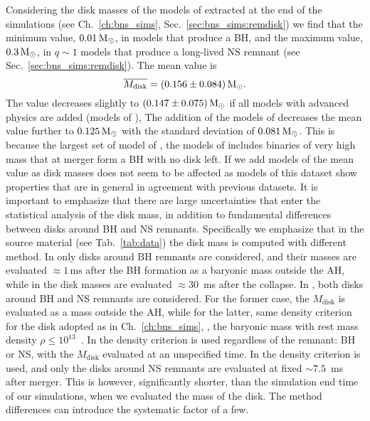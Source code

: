  

Considering the disk masses of the models of \DSrefset{} extracted at the end of 
the simulations (see Ch.~\ref{ch:bns_sims}, Sec.~\ref{sec:bns_sims:remdisk}) we find that the minimum value, 
$0.01\,{\text{M}_{\odot}}$, in models that produce a \ac{BH}, and the maximum value, $0.3\,{\text{M}_{\odot}}$, 
in $q\sim 1$ models that produce a long-lived \ac{NS} remnant 
(see Sec.~\ref{sec:bns_sims:remdisk}).
%
The mean value is  
%
\begin{equation}
\overline{M_{\rm disk}} = (0.156 \pm 0.084)\,{\text{M}_{\odot}}.
\end{equation}
%
The value decreases slightly to $(0.147 \pm 0.075)\,{\text{M}_{\odot}}$ if all models with 
advanced physics are added (models of \DSheatcool{}), 
The addition of the models of \DScool{} decreases the mean value further to $0.125\,{\text{M}_{\odot}}$ 
with the standard deviation of $0.081\,{\text{M}_{\odot}}$. This is because the largest set of model of 
\DScool{}, the models of \citet{Radice:2018pdn} includes binaries of very high mass that 
at merger form a \ac{BH} with no disk left. 
If we add models of \DSnone{} the mean value as disk masses 
does not seem to be affected as models of this dataset show 
properties that are in general in agreement with previous 
datasets.
%
It is important to emphasize that there are large uncertainties that 
enter the statistical analysis of the 
disk mass, in addition to fundamental differences between disks around \ac{BH} and \ac{NS} remnants.
Specifically we emphasize that in the source material (see Tab.~\ref{tab:data}) the disk mass is 
computed with different method. 
%
In \citet{Dietrich:2015iva,Dietrich:2016hky} only disks around \ac{BH} remnants are considered, 
and their masses are evaluated ${\approx}1\,$ms after the \ac{BH} formation as a baryonic mass 
outside the \ac{AH}, while in \citet{Sekiguchi:2016bjd} the disk masses are evaluated 
${\approx}30$~ms after the collapse.
%
In \citet{Radice:2018pdn}, both disks around \ac{BH} and \ac{NS} remnants are considered. 
For the former case, the $M_{\text{disk}}$ is evaluated as a mass outside the \ac{AH}, while for
the latter, same density criterion for the disk adopted as in Ch.~\ref{ch:bns_sims}, \ie, the 
baryonic mass with rest mass density $\rho\leq10^{13}$~\gcm.
%
In \citet{Kiuchi:2019lls} the density criterion is used regardless of the remnant: 
\ac{BH} or \ac{NS}, with the $M_{\text{disk}}$ evaluated at an unspecified time.
%
In \citet{Vincent:2019kor} the density criterion is used, and only the disks around 
\ac{NS} remnants are evaluated at fixed ${\sim}7.5$~ms after merger. This is however,
significantly shorter, than the simulation end time of our simulations, when we evaluated 
the mass of the disk. 
%
The method differences can introduce the systematic factor of a few.


